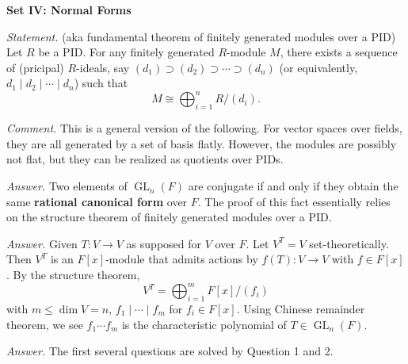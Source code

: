 \documentclass{mathproblems}
\begin{document}
\newpage

\centerline {\textbf{Set IV: Normal Forms}}

\begin{questions}


\textit{Statement.} (aka fundamental theorem of finitely generated modules over a PID) Let $R$ be a PID. For any finitely generated $R$-module $M$, there exists a sequence of (pricipal) $R$-ideals, say $(d_1)\supset (d_2) \supset \cdots \supset (d_n)$ (or equivalently, $d_1 \mid d_2 \mid \cdots \mid d_n$) such that
$$
M\cong \bigoplus_{i=1}^n R/(d_i).
$$

\textit{Comment.} This is a general version of the following. For vector spaces over fields, they are all generated by a set of basis flatly. However, the modules are possibly not flat, but they can be realized as quotients over PIDs.

\textit{Answer.} Two elements of $\operatorname{GL}_n(F)$ are conjugate if and only if they obtain the same {\color{violet}\textbf{rational canonical form}} over $F$. The proof of this fact essentially relies on the structure theorem of finitely generated modules over a PID.


\textit{Answer.} Given $T: V\to V$ as supposed for $V$ over $F$. Let $V^T=V$ set-theoretically. Then $V^T$ is an $F[x]$-module that admits actions by $f(T):V \to V$ with $f\in F[x]$. By the structure theorem,
$$
V^T=\bigoplus_{i=1}^m F[x]/(f_i)
$$
with $m\leqslant \dim V=n$, $f_1\mid \cdots \mid f_m$ for $f_i\in F[x]$. Using Chinese remainder theorem, we see $f_1\cdots f_m$ is the characteristic polynomial of $T\in \operatorname{GL}_n(F)$.


\textit{Answer.} The first several questions are solved by Question 1 and 2.


\end{questions}
\end{document}
